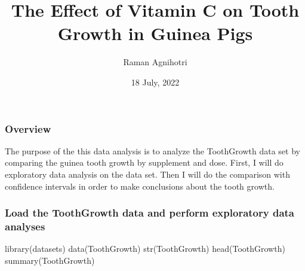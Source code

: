 \documentclass[
]{article}
\title{The Effect of Vitamin C on Tooth Growth in Guinea Pigs}
\author{Raman Agnihotri}
\date{18 July, 2022}
\newenvironment{Shaded}{\begin{snugshade}}{\end{snugshade}}
\newcommand{\AttributeTok}[1]{\textcolor[rgb]{0.77,0.63,0.00}{#1}}
\newcommand{\ConstantTok}[1]{\textcolor[rgb]{0.00,0.00,0.00}{#1}}
\newcommand{\FunctionTok}[1]{\textcolor[rgb]{0.00,0.00,0.00}{#1}}
\newcommand{\NormalTok}[1]{#1}
\newcommand{\OtherTok}[1]{\textcolor[rgb]{0.56,0.35,0.01}{#1}}
\newcommand{\SpecialCharTok}[1]{\textcolor[rgb]{0.00,0.00,0.00}{#1}}
\newcommand{\StringTok}[1]{\textcolor[rgb]{0.31,0.60,0.02}{#1}}
\begin{document}
\maketitle

\hypertarget{overview}{%
\subsubsection{Overview}\label{overview}}

The purpose of the this data analysis is to analyze the ToothGrowth data
set by comparing the guinea tooth growth by supplement and dose. First,
I will do exploratory data analysis on the data set. Then I will do the
comparison with confidence intervals in order to make conclusions about
the tooth growth.

\hypertarget{load-the-toothgrowth-data-and-perform-exploratory-data-analyses}{%
\subsubsection{Load the ToothGrowth data and perform exploratory data
analyses}\label{load-the-toothgrowth-data-and-perform-exploratory-data-analyses}}

\begin{Shaded}
\begin{Highlighting}[]
\FunctionTok{library}\NormalTok{(datasets)}
\FunctionTok{data}\NormalTok{(ToothGrowth)}
\FunctionTok{str}\NormalTok{(ToothGrowth)}
\FunctionTok{head}\NormalTok{(ToothGrowth)}
\FunctionTok{summary}\NormalTok{(ToothGrowth)}
\end{Highlighting}
\end{Shaded}

\begin{Shaded}
\end{Shaded}
\end{document}
